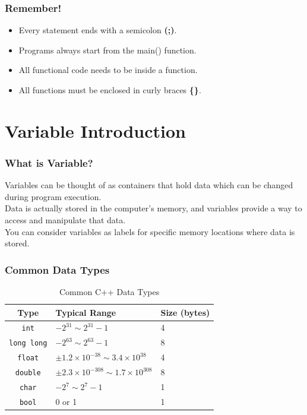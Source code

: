 \documentclass[xcolor=dvipsnames]{beamer}
\begin{document}
    \begin{frame}
        \frametitle{Remember!}
        \begin{itemize}
            \item Every statement ends with a semicolon \textbf{(;)}.
            \item Programs always start from the \alert{main()} function.
            \item All functional code needs to be inside a function.
            \item All functions must be enclosed in curly braces \textbf{\{\}}.
        \end{itemize}
    \end{frame}

    \section{Variable Introduction}
    \begin{frame}
        \frametitle{What is Variable?}
        Variables can be thought of as \alert{containers} that hold data which can be changed during program execution.\\
        Data is actually stored in the computer's memory, and variables provide a way to access and manipulate that data.\\
        You can consider variables as \alert{labels} for specific memory locations where data is stored.
    \end{frame}

    \begin{frame}
        \frametitle{Common Data Types}
        \begin{table}[h]
        \centering
        \caption{Common C++ Data Types}
        \begin{tabular}{cll}
        \toprule
        \textbf{Type} & \textbf{Typical Range} & \textbf{Size (bytes)} \\
        \midrule
        \texttt{int}        & $-2^{31}\sim 2^{31}-1$ & 4 \\
        \texttt{long long}  & $-2^{63}\sim 2^{63}-1$ & 8 \\
        \texttt{float}      & $\pm 1.2 \times 10^{-38}\sim 3.4 \times 10^{38}$ & 4 \\
        \texttt{double}     & $\pm 2.3 \times 10^{-308}\sim 1.7 \times 10^{308}$ & 8 \\
        \texttt{char}       & $-2^7\sim 2^7-1$ & 1 \\
        \texttt{bool}     & 0 or 1 & 1 \\
        \bottomrule
        \end{tabular}
        \end{table}        
    \end{frame}
\end{document}
